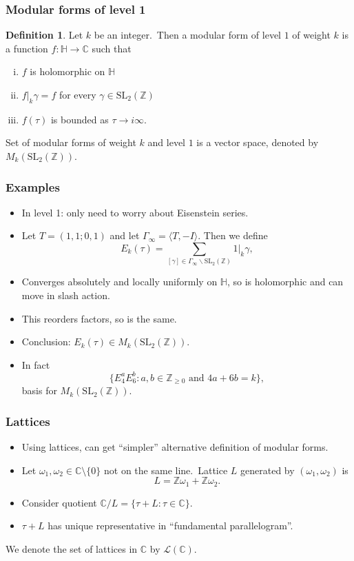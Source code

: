 \documentclass[usenames,dvipsnames]{beamer}
\theoremstyle{definition}
\newtheorem{defi}{Definition}
\begin{document}
\begin{frame}
  \frametitle{Modular forms of level 1}
  \begin{defi}
    Let $k$ be an integer.\pause~Then a modular form of level $1$ of weight $k$ is a function $f:\mathbb{H}\to\mathbb{C}$ such that\pause
    \begin{enumerate}[(i)]
      \item $f$ is holomorphic on $\mathbb{H}$\pause
      \item $f|_k\gamma=f$ for every $\gamma\in\mathrm{SL}_2(\mathbb{Z})$\pause
      \item $f(\tau)$ is bounded as $\tau\to i\infty$.\pause
    \end{enumerate}
  \end{defi}
  Set of modular forms of weight $k$ and level $1$ is a vector space, denoted by $M_k(\mathrm{SL}_2(\mathbb{Z}))$.
\end{frame}

\begin{frame}
  \frametitle{Examples}
  \begin{itemize}
    \item In level 1: only need to worry about Eisenstein series.\pause
    \item Let $T=(1,1;0,1)$ and let $\Gamma_\infty=\langle T,-I\rangle$. Then we define\pause
      \[E_k(\tau)=\sum_{[\gamma]\in\Gamma_\infty\backslash\mathrm{SL}_2(\mathbb{Z})}1|_k\gamma,\]\pause
    \item Converges absolutely and locally uniformly on $\mathbb{H}$, so is holomorphic and can move in slash action.\pause
    \item This reorders factors, so is the same.\pause
    \item Conclusion: $E_k(\tau)\in M_k(\mathrm{SL}_2(\mathbb{Z}))$.\pause
    \item In fact\pause
      \[\{E_4^aE_6^b:a,b\in\mathbb{Z}_{\geq 0}\text{ and }4a+6b=k\},\]\pause
      basis for $M_k(\mathrm{SL}_2(\mathbb{Z}))$.
  \end{itemize}
\end{frame}

\begin{frame}
  \frametitle{Lattices}
  \begin{itemize}
    \item Using lattices, can get ``simpler'' alternative definition of modular forms.\pause
    \item Let $\omega_1,\omega_2\in\mathbb{C}\setminus\{0\}$ not on the same line.\pause~Lattice $L$ generated by $(\omega_1,\omega_2)$ is\pause
      \[L=\mathbb{Z}\omega_1+\mathbb{Z}\omega_2.\]\pause
    \item Consider quotient $\mathbb{C}/L=\{\tau+L:\tau\in\mathbb{C}\}$.\pause
    \item $\tau+L$ has unique representative in ``fundamental parallelogram''.\pause
  \end{itemize}
  We denote the set of lattices in $\mathbb{C}$ by $\mathcal{L}(\mathbb{C})$.
\end{frame}
\end{document}
